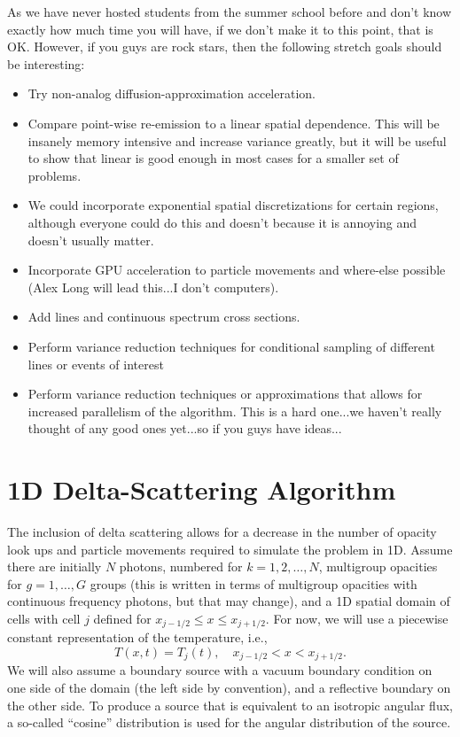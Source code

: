 \documentclass{article}
\newcommand{\xl}{{x_{j-1/2}}}
\newcommand{\xr}{{x_{j+1/2}}}
\begin{document}
As we have never hosted students from the summer school before and don't know
exactly how much time you will have, if we don't make
it to this point, that is OK.  However, if you guys are rock stars, then the
following stretch goals should be interesting:

\begin{itemize}

\item Try non-analog diffusion-approximation acceleration.
\item Compare point-wise re-emission to a linear spatial dependence.  This will
be insanely memory intensive and increase variance greatly, but it will be useful to show that linear is
good enough in most cases for a smaller set of problems.  
\item We could incorporate exponential spatial discretizations for certain
regions, although everyone could do this and doesn't because it is annoying and
doesn't usually matter.
\item Incorporate GPU acceleration to particle movements and where-else possible
(Alex Long will lead this...I don't computers).
\item Add lines and continuous spectrum cross sections.
\item Perform variance reduction techniques for conditional sampling of
different lines or events of interest
\item Perform variance reduction techniques or approximations that allows for increased
parallelism of the algorithm.  This is a hard one...we haven't really thought of
any good ones yet...so if you guys have ideas...

\end{itemize}

\section{1D Delta-Scattering Algorithm}

The inclusion of delta scattering allows for a decrease in the number of opacity
look ups and particle movements required to simulate the problem in 1D. Assume
there are initially $N$ photons, numbered for $k=1,2,\ldots,N$, multigroup opacities for
$g=1,\ldots,G$ groups (this is written in terms of multigroup opacities with
continuous frequency photons, but that may change), and a 1D spatial domain of cells with cell $j$ defined
for $\xl \leq x \leq \xr$.  For now, we will use a piecewise constant representation of the temperature, i.e.,
\begin{equation}
 T(x,t) = T_j(t), \quad \xl < x < \xr.
\end{equation}
We will also assume a boundary source with a vacuum boundary condition on one
side of the domain (the left side by convention), and a reflective boundary on
the other side.  To produce a source that is equivalent to an isotropic angular
flux, a so-called ``cosine'' distribution is used for the angular distribution of the
source.
\end{document}
